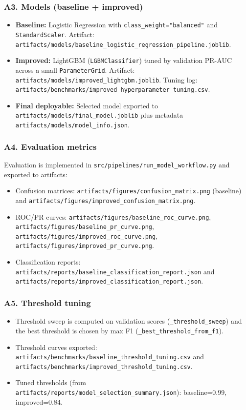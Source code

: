 \documentclass[11pt]{article}
\newcommand{\code}[1]{\texttt{#1}}
\begin{document}
\subsubsection*{A3. Models (baseline + improved)}
\begin{itemize}
  \item \textbf{Baseline:} Logistic Regression with \code{class\_weight="balanced"} and \code{StandardScaler}. Artifact: \code{artifacts/models/baseline\_logistic\_regression\_pipeline.joblib}.
  \item \textbf{Improved:} LightGBM (\code{LGBMClassifier}) tuned by validation PR-AUC across a small \code{ParameterGrid}. Artifact: \code{artifacts/models/improved\_lightgbm.joblib}. Tuning log: \code{artifacts/benchmarks/improved\_hyperparameter\_tuning.csv}.
  \item \textbf{Final deployable:} Selected model exported to \code{artifacts/models/final\_model.joblib} plus metadata \code{artifacts/models/model\_info.json}.
\end{itemize}

\subsubsection*{A4. Evaluation metrics}
Evaluation is implemented in \code{src/pipelines/run\_model\_workflow.py} and exported to artifacts:
\begin{itemize}
  \item Confusion matrices: \code{artifacts/figures/confusion\_matrix.png} (baseline) and \code{artifacts/figures/improved\_confusion\_matrix.png}.
  \item ROC/PR curves: \code{artifacts/figures/baseline\_roc\_curve.png}, \code{artifacts/figures/baseline\_pr\_curve.png}, \code{artifacts/figures/improved\_roc\_curve.png}, \code{artifacts/figures/improved\_pr\_curve.png}.
  \item Classification reports: \code{artifacts/reports/baseline\_classification\_report.json} and \code{artifacts/reports/improved\_classification\_report.json}.
\end{itemize}

\subsubsection*{A5. Threshold tuning}
\begin{itemize}
  \item Threshold sweep is computed on validation scores (\code{_threshold\_sweep}) and the best threshold is chosen by max F1 (\code{_best\_threshold\_from\_f1}).
  \item Threshold curves exported:
    \code{artifacts/benchmarks/baseline\_threshold\_tuning.csv} and \code{artifacts/benchmarks/improved\_threshold\_tuning.csv}.
  \item Tuned thresholds (from \code{artifacts/reports/model\_selection\_summary.json}):
    baseline=0.99, improved=0.84.
\end{itemize}
\end{document}
